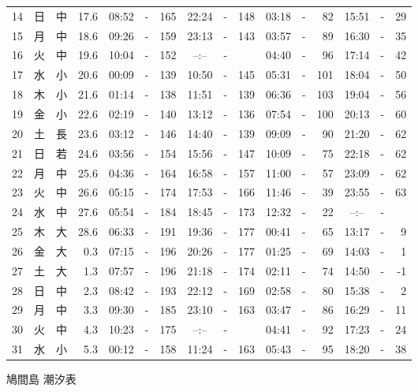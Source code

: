 \documentclass[12pt.a4j]{jsarticle}
\begin{document}
\begin{center}
\begin{table}[ht]
\begin{tabular}{|rc|cr|ccrccr|ccrccr|}
14 & 日 & 中 & 17.6 &  08:52 &-& 165  &  22:24 &-& 148  &   03:18 &-&  82  &   15:51 &-&  29  \\
15 & 月 & 中 & 18.6 &  09:26 &-& 159  &  23:13 &-& 143  &   03:57 &-&  89  &   16:30 &-&  35  \\
16 & 火 & 中 & 19.6 &  10:04 &-& 152  &  --:-- &-&     &   04:40 &-&  96  &   17:14 &-&  42  \\
17 & 水 & 小 & 20.6 &  00:09 &-& 139  &  10:50 &-& 145  &   05:31 &-& 101  &   18:04 &-&  50  \\
18 & 木 & 小 & 21.6 &  01:14 &-& 138  &  11:51 &-& 139  &   06:36 &-& 103  &   19:04 &-&  56  \\
19 & 金 & 小 & 22.6 &  02:19 &-& 140  &  13:12 &-& 136  &   07:54 &-& 100  &   20:13 &-&  60  \\
20 & 土 & 長 & 23.6 &  03:12 &-& 146  &  14:40 &-& 139  &   09:09 &-&  90  &   21:20 &-&  62  \\
21 & 日 & 若 & 24.6 &  03:56 &-& 154  &  15:56 &-& 147  &   10:09 &-&  75  &   22:18 &-&  62  \\
22 & 月 & 中 & 25.6 &  04:36 &-& 164  &  16:58 &-& 157  &   11:00 &-&  57  &   23:09 &-&  62  \\
23 & 火 & 中 & 26.6 &  05:15 &-& 174  &  17:53 &-& 166  &   11:46 &-&  39  &   23:55 &-&  63  \\
24 & 水 & 中 & 27.6 &  05:54 &-& 184  &  18:45 &-& 173  &   12:32 &-&  22  &   --:-- &-&     \\
25 & 木 & 大 & 28.6 &  06:33 &-& 191  &  19:36 &-& 177  &   00:41 &-&  65  &   13:17 &-&   9  \\
26 & 金 & 大 &  0.3 &  07:15 &-& 196  &  20:26 &-& 177  &   01:25 &-&  69  &   14:03 &-&   1  \\
27 & 土 & 大 &  1.3 &  07:57 &-& 196  &  21:18 &-& 174  &   02:11 &-&  74  &   14:50 &-&  -1  \\
28 & 日 & 中 &  2.3 &  08:42 &-& 193  &  22:12 &-& 169  &   02:58 &-&  80  &   15:38 &-&   2  \\
29 & 月 & 中 &  3.3 &  09:30 &-& 185  &  23:10 &-& 163  &   03:47 &-&  86  &   16:29 &-&  11  \\
30 & 火 & 中 &  4.3 &  10:23 &-& 175  &  --:-- &-&     &   04:41 &-&  92  &   17:23 &-&  24  \\
31 & 水 & 小 &  5.3 &  00:12 &-& 158  &  11:24 &-& 163  &   05:43 &-&  95  &   18:20 &-&  38  \\
   \hline
   \end{tabular}
\end{table}
\newpage
 {\LARGE 鳩間島  潮汐表　　　}

\end{center}
\end{document}
